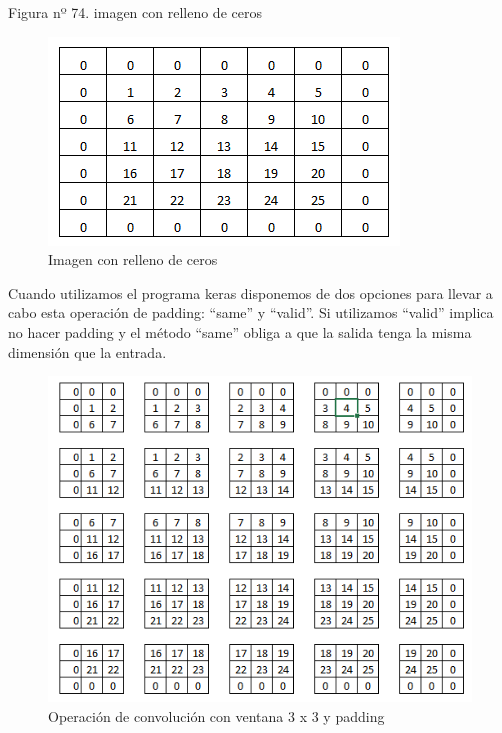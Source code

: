 \documentclass[
  a4paper,
  DIV=11,
  numbers=noendperiod]{scrreprt}
\begin{document}
Figura nº 74. imagen con relleno de ceros

\begin{figure}

{\centering \includegraphics{imagenes/capitulo1/relleno_ceros.png}

}

\caption{\label{fig-relleno-ceros}Imagen con relleno de ceros}

\end{figure}

Cuando utilizamos el programa keras disponemos de dos opciones para
llevar a cabo esta operación de padding: ``same'' y ``valid''. Si
utilizamos ``valid'' implica no hacer padding y el método ``same''
obliga a que la salida tenga la misma dimensión que la entrada.

\begin{figure}

{\centering \includegraphics{imagenes/capitulo1/con_padding.png}

}

\caption{\label{fig-con-padding}Operación de convolución con ventana 3 x
3 y padding}

\end{figure}
\end{document}
